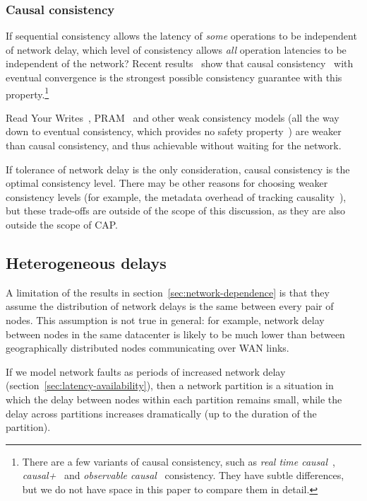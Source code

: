 \documentclass[a4paper,twocolumn,10pt]{article}
\begin{document}
\subsubsection{Causal consistency}

If sequential consistency allows the latency of \emph{some} operations to be independent of network
delay, which level of consistency allows \emph{all} operation latencies to be independent of the
network? Recent results~\cite{Attiya2015dm, Mahajan2011wz} show that causal
consistency~\cite{Ahamad1995gl} with eventual convergence is the strongest possible consistency
guarantee with this property.\footnote{There are a few variants of causal consistency, such as
\emph{real time causal}~\cite{Mahajan2011wz}, \emph{causal+}~\cite{Lloyd2011hz} and
\emph{observable causal}~\cite{Attiya2015dm} consistency. They have subtle differences, but we do
not have space in this paper to compare them in detail.}

Read Your Writes~\cite{Terry1994fp}, PRAM~\cite{Lipton1988uh} and other weak consistency models (all
the way down to eventual consistency, which provides no safety property~\cite{Bailis2013jc}) are
weaker than causal consistency, and thus achievable without waiting for the network.

If tolerance of network delay is the only consideration, causal consistency is the optimal
consistency level. There may be other reasons for choosing weaker consistency levels (for example,
the metadata overhead of tracking causality~\cite{CharronBost1991ec, Attiya2015dm}), but these
trade-offs are outside of the scope of this discussion, as they are also outside the scope of CAP.

\subsection{Heterogeneous delays}

A limitation of the results in section~\ref{sec:network-dependence} is that they assume the
distribution of network delays is the same between every pair of nodes. This assumption is not true
in general: for example, network delay between nodes in the same datacenter is likely to be much
lower than between geographically distributed nodes communicating over WAN links.

If we model network faults as periods of increased network delay
(section~\ref{sec:latency-availability}), then a network partition is a situation in which the delay
between nodes within each partition remains small, while the delay across partitions increases
dramatically (up to the duration of the partition).
\end{document}

